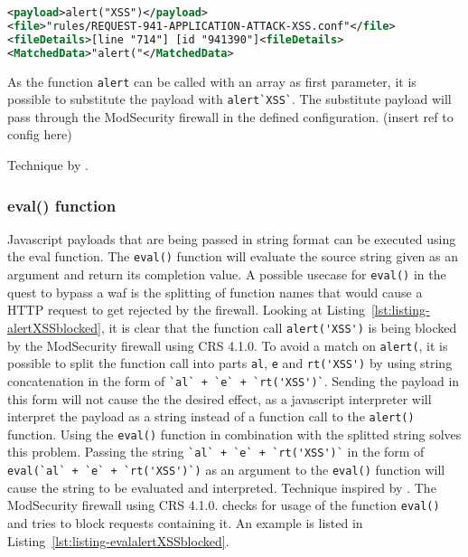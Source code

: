 \begin{lstlisting}[style=ruleStyle, language=XML, caption=alert("XSS") blocking example, label=lst:listing-alertXSSblocked]
<payload>alert("XSS")</payload>
<file>"rules/REQUEST-941-APPLICATION-ATTACK-XSS.conf"</file>
<fileDetails>[line "714"] [id "941390"]<fileDetails>
<MatchedData>"alert("</MatchedData>
\end{lstlisting}

As the function \verb|alert| can be called with an array as first parameter, it is possible to substitute the payload with \verb|alert`XSS`|. The substitute payload will pass through the ModSecurity firewall in the defined configuration. {\color{red}(insert ref to config here)}

Technique by \cite{onecons/wafbypass}.

\subsubsection{eval() function}
\label{sec:eval}

Javascript payloads that are being passed in string format can be executed using the eval function. The \verb|eval()| function will evaluate the source string given as an argument and return its completion value. \cite{js/eval}
A possible usecase for \verb|eval()| in the quest to bypass a \gls{waf} is the splitting of function names that would cause a HTTP request to get rejected by the firewall.
Looking at Listing~\ref{lst:listing-alertXSSblocked}, it is clear that the function call \verb|alert('XSS')| is being blocked by the ModSecurity firewall using CRS 4.1.0.
To avoid a match on \verb|alert(|, it is possible to split the function call into parts \verb|al|, \verb|e| and \verb|rt('XSS')| by using string concatenation in the form of \verb|`al` + `e` + `rt('XSS')`|.
Sending the payload in this form will not cause the the desired effect, as a javascript interpreter will interpret the payload as a string instead of a function call to the \verb|alert()| function.
Using the \verb|eval()| function in combination with the splitted string solves this problem. Passing the string \verb|`al` + `e` + `rt('XSS')`| in the form of \verb|eval(`al` + `e` + `rt('XSS')`)| as an argument to the \verb|eval()| function will cause the string to be evaluated and interpreted. Technique inspired by \cite{onecons/wafbypass}.
The ModSecurity firewall using CRS 4.1.0. checks for usage of the function \verb|eval()| and tries to block requests containing it. An example is listed in Listing~\ref{lst:listing-evalalertXSSblocked}.


